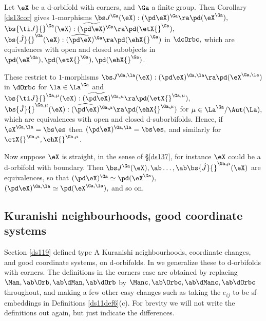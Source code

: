 \documentclass{article}
\begin{document}
\begin{prop} Let\/ $\eX$ be a d-orbifold with corners, and\/ $\Ga$ a
finite group. Then Corollary\/ {\rm\ref{ds13cor}} gives\/
$1$-morphisms $\bs J{}^\Ga(\eX):(\pd\eX)^\Ga\ra \pd(\eX^\Ga),$
$\bs{\ti J}{}^\Ga(\eX): {{}\,\,\,\,\widetilde{\!\!\!\!(\pd\eX)
\!\!\!\!}\,\,\,\,^\Ga}\ra \pd(\etX{}^\Ga),$ $\bs{\hat
J}{}^\Ga(\eX):\,\,\,\,\widehat{\!\!\!\!
(\pd\eX)\!\!\!\!}\,\,\,\,^\Ga\ra\pd(\ehX{}^\Ga)$ in\/ $\dcOrbc,$
which are equivalences with open and closed subobjects
in\/~$\pd(\eX^\Ga),\pd(\etX{}^\Ga),\pd(\ehX{}^\Ga)$.

These restrict to $1$-morphisms $\bs J^{\Ga,\la}(\eX):
(\pd\eX)^{\Ga,\la} \ra \pd(\eX^{\Ga,\la})$ in\/ $\dOrbc$ for
$\la\in\La^\Ga$ and\/ $\bs{\ti J}{}^{\Ga,\mu}(\eX):
\,\,\,\,\widetilde{\!\!\!\!(\pd\eX)\!\!\!\!}\,\,\,\,^{\Ga,\mu}\ra
\pd(\etX{}^{\Ga,\mu}),$ $\bs{\hat J}{}^{\Ga,\mu}(\eX):
\,\,\,\,\widehat{\!\!\!\! (\pd\eX)\!\!\!\!}\,\,\,\,^{\Ga,\mu}\ra
\pd(\ehX{}^{\Ga,\mu})$ for $\mu\in\La^\Ga/\Aut(\La),$ which are
equivalences with open and closed d-suborbifolds. Hence, if\/
$\eX^{\Ga,\la}=\bs\es$ then $(\pd\eX)^{\Ga,\la}=\bs\es,$ and
similarly for\/~$\etX{}^{\Ga,\mu},\ehX{}^{\Ga,\mu}$.

Now suppose $\eX$ is straight, in the sense of\/
{\rm\S\ref{ds137},} for instance $\eX$ could be a d-orbifold with
boundary. Then $\bs
J{}^\Ga(\eX),\ab\ldots,\ab\bs{\hat J}{}^{\Ga,\mu}(\eX)$ are
equivalences, so that\/ $(\pd\eX)^\Ga\simeq \pd(\eX^\Ga),$
$(\pd\eX)^{\Ga,\la}\simeq \pd(\eX^{\Ga,\la}),$ and so on.
\label{ds14prop2}
\end{prop}

\subsection[Kuranishi neighbourhoods and good coordinate
systems]{Kuranishi neighbourhoods, good coordinate systems}
\label{ds149}

Section \ref{ds119} defined type A Kuranishi neighbourhoods,
coordinate changes, and good coordinate systems, on d-orbifolds. In
\cite[\S 12.9]{Joyc6} we generalize these to d-orbifolds with
corners. The definitions in the corners case are obtained by
replacing $\Man,\ab\Orb,\ab\dMan,\ab\dOrb$ by
$\Manc,\ab\Orbc,\ab\dManc, \ab\dOrbc$ throughout, and making a few
other easy changes such as taking the $e_{ij}$ to be sf-embeddings
in Definitions \ref{ds11def6}(c). For brevity we will not write the
definitions out again, but just indicate the differences.
\end{document}
